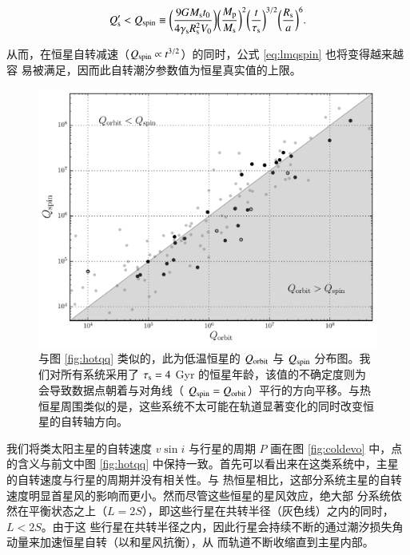 \begin{equation} \label{eq:lmqspin}
Q_\mathrm{s}^{\prime} < Q_\mathrm{spin} \equiv \bigg( 
\frac{9G M_\mathrm{s}t_0}{4 \gamma_\mathrm{s}R_\mathrm{s}^2V_0} \bigg) 
\bigg( \frac{M_\mathrm{p}}{M_\mathrm{s}} \bigg)^2  
\bigg( \frac{t}{\tau_\mathrm{s}} \bigg)^{3/2} \bigg( \frac{R_\mathrm{s}}{a} \bigg)^6.
\end{equation} %

从而，在恒星自转减速（$Q_\mathrm{spin} \propto t^{3/2}$）的同时，公式 \ref{eq:lmqspin} 也将变得越来越容
易被满足，因而此自转潮汐参数值为恒星真实值的上限。

\begin{figure}[t]
\centering
\includegraphics[width=1.0\textwidth]{figures/chapter4/fig10b_cold.pdf}
\caption{与图 \ref{fig:hotqq} 类似的，此为低温恒星的 $Q_\mathrm{orbit}$ 与 $Q_\mathrm{spin}$ 分布图。我们对所有系统采用了 $\tau_\mathrm{s} = 4$ Gyr 的恒星年龄，该值的不确定度则为会导致数据点朝着与对角线（ $Q_\mathrm{spin} = Q_\mathrm{orbit}$）平行的方向平移。与热恒星周围类似的是，这些系统不太可能在轨道显著变化的同时改变恒星的自转轴方向。} 
\label{fig:coldqq}
\end{figure}


我们将类太阳主星的自转速度 $v\sin i$ 与行星的周期 $P$ 画在图 \ref{fig:coldevo} 中，点的含义与前文中图 \ref{fig:hotqq} 中保持一致。首先可以看出来在这类系统中，主星的自转速度与行星的周期并没有相关性。与
热恒星相比，这部分系统主星的自转速度明显首星风的影响而更小。然而尽管这些恒星的星风效应，绝大部
分系统依然在平衡状态之上（$L=2S$），即这些行星在共转半径（灰色线）之内的同时，$L<2S$。由于这
些行星在共转半径之内，因此行星会持续不断的通过潮汐损失角动量来加速恒星自转（以和星风抗衡），从
而轨道不断收缩直到主星内部。

